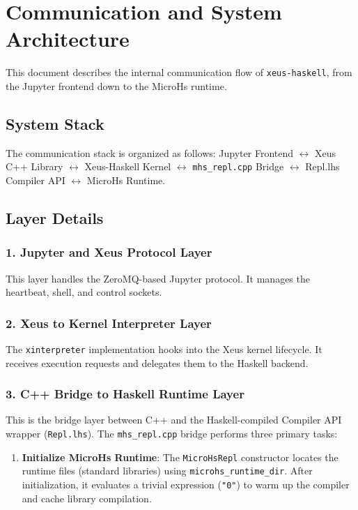 \section{Communication and System Architecture}
\label{sec:communication}


This document describes the internal communication flow of \texttt{xeus-haskell}, from the Jupyter frontend down to the MicroHs runtime.
\subsection{System Stack}


The communication stack is organized as follows:
Jupyter Frontend \(\leftrightarrow\) Xeus C++ Library \(\leftrightarrow\) Xeus-Haskell Kernel \(\leftrightarrow\) \texttt{mhs\_repl.cpp} Bridge \(\leftrightarrow\) Repl.lhs Compiler API \(\leftrightarrow\) MicroHs Runtime.


\subsection{Layer Details}


\subsubsection{1. Jupyter and Xeus Protocol Layer}


This layer handles the ZeroMQ-based Jupyter protocol. It manages the heartbeat, shell, and control sockets.
\subsubsection{2. Xeus to Kernel Interpreter Layer}


The \texttt{xinterpreter} implementation hooks into the Xeus kernel lifecycle. It receives execution requests and delegates them to the Haskell backend.
\subsubsection{3. C++ Bridge to Haskell Runtime Layer}


This is the bridge layer between C++ and the Haskell-compiled Compiler API wrapper (\texttt{Repl.lhs}).
The \texttt{mhs\_repl.cpp} bridge performs three primary tasks:
\begin{enumerate}
\item \textbf{Initialize MicroHs Runtime}:
   The \texttt{MicroHsRepl} constructor locates the runtime files (standard libraries) using \texttt{microhs\_runtime\_dir}. After initialization, it evaluates a trivial expression (\texttt{"0"}) to warm up the compiler and cache library compilation.\end{enumerate}


